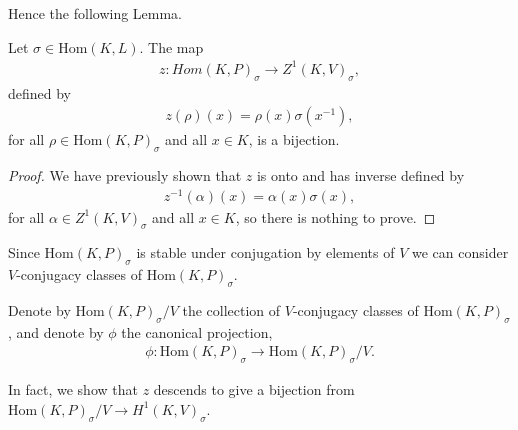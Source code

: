 Hence the following Lemma.

\begin{lemma}
  Let $\sigma \in \mathrm{Hom}(K, L)$. The map
\begin{eqnarray*} z: Hom(K, P)_{\sigma} \rightarrow Z^1(K, V)_\sigma, \end{eqnarray*}
defined by
\begin{eqnarray*} z(\rho)(x) = \rho(x)\sigma(x^{-1}), \end{eqnarray*}
for all $\rho \in \mathrm{Hom}(K, P)_\sigma$ and all $x \in K$, is a bijection.
\label{lem:hom_z1}
\end{lemma}
\begin{proof}
We have previously shown that $z$ is onto and has inverse defined by
\begin{eqnarray*} z^{-1}(\alpha)(x) = \alpha(x)\sigma(x), \end{eqnarray*}
for all $\alpha \in Z^1(K, V)_\sigma$ and all $x \in K$, so there is nothing to prove.
\end{proof}


Since $\mathrm{Hom}(K, P)_\sigma$ is stable under conjugation by elements of $V$ we can consider $V$-conjugacy classes of $\mathrm{Hom}(K, P)_\sigma$.
\begin{definition} Denote by $\mathrm{Hom}(K, P)_\sigma / V$ the collection of $V$-conjugacy classes of $\mathrm{Hom}(K, P)_\sigma$, and denote by $\phi$ the canonical projection,
\begin{eqnarray*} \phi : \mathrm{Hom}(K, P)_\sigma \rightarrow \mathrm{Hom}(K, P)_\sigma / V. \end{eqnarray*}
\end{definition}

In fact, we show that $z$ descends to give a bijection from $\mathrm{Hom}(K, P)_\sigma / V \rightarrow H^1(K, V)_\sigma$.

